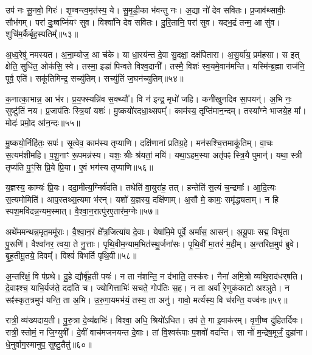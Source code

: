 उप॑ नः सू॒नवो॒ गिरः॑।
शृ॒ण्वन्त्व॒मृत॑स्य॒ ये।
सु॒मृ॒डी॒का भ॑वन्तु नः।
अ॒द्या नो॑ देव सवितः।
प्र॒जाव॑थ्सावीः॒ सौभ॑गम्।
परा॑ दुः॒ष्वप्नि॑यꣳ सुव।
विश्वा॑नि देव सवितः।
दु॒रि॒तानि॒ परा॑ सुव।
यद्भ॒द्रं तन्म॒ आ सु॑व।
शुचि॑म॒र्कैर्बृह॒स्पतिम्᳚॥५३॥

अ॒ध्व॒रेषु॑ नमस्यत।
अ॒ना॒म्योज॒ आ च॑के।
या धा॒रय॑न्त दे॒वा सु॒दक्षा॒ दक्ष॑पितारा।
अ॒सु॒र्या॑य॒ प्रम॑हसा।
स इत् क्षेति॒ सुधि॑त॒ ओक॑सि॒ स्वे।
तस्मा॒ इडा॑ पिन्वते विश्व॒दानी᳚।
तस्मै॒ विशः॑ स्व॒यमे॒वान॑मन्ति।
यस्मि॑न्ब्र॒ह्मा राज॑नि॒ पूर्व॒ एति॑।
सकू॑तिमिन्द्र॒ सच्यु॑तिम्।
सच्यु॑तिं ज॒घन॑च्युतिम्॥५४॥

क॒नात्का॒भान्न॒ आ भ॑र।
प्र॒य॒फ्स्यन्नि॑व स॒क्थ्यौ᳚।
वि न॑ इन्द्र॒ मृधो॑ जहि।
कनी॑खुनदिव सा॒पयन्॑।
अ॒भि नः॒ सुष्टु॑तिं नय।
प्र॒जा\-प॑तिः स्त्रि॒यां यशः॑।
मु॒ष्कयो॑रदधा॒थ्सपम्᳚।
काम॑स्य॒ तृप्ति॑मान॒न्दम्।
तस्या᳚ग्ने भाजये॒ह मा᳚।
मोदः॑ प्रमो॒द आ॑न॒न्दः॥५५॥

मु॒ष्कयो॒र्निहि॑तः॒ सपः॑।
सृ॒त्वेव॒ काम॑स्य तृप्याणि।
दक्षि॑णानां प्रतिग्र॒हे।
मन॑सश्चि॒त्तमाकू॑तिम्।
वा॒चः स॒त्यम॑शीमहि।
प॒शू॒नाꣳ रू॒पमन्न॑स्य।
यशः॒ श्रीः श्र॑यतां॒ मयि॑।
यथा॒ऽहम॒स्या अतृ॑पꣴ स्त्रि॒यै पुमान्॑।
यथा॒ स्त्री तृप्य॑ति पु॒ꣳ॒सि प्रि॒ये प्रि॒या।
ए॒वं भग॑स्य तृप्याणि॥५६॥

य॒ज्ञस्य॒ काम्यः॑ प्रि॒यः।
ददा॒मीत्य॒ग्निर्व॑दति।
तथेति॑ वा॒युरा॑ह॒ तत्।
हन्तेति॑ स॒त्यं च॒न्द्रमाः᳚।
आ॒दि॒त्यः स॒त्यमोमिति॑।
आप॒स्तथ्स॒त्यमा भ॑रन्।
यशो॑ य॒ज्ञस्य॒ दक्षि॑णाम्।
अ॒सौ मे॒ कामः॒ समृ॑द्ध्यताम्।
न हि स्पश॒मवि॑दन्न॒न्यम॒स्मात्।
वै॒श्वा॒न॒रात्पु॑रए॒तार॑म॒ग्नेः॥५७॥

अथे॑ममन्थन्न॒मृत॒ममू॑राः।
वै॒श्वा॒न॒रं क्षे᳚त्र॒जित्या॑य दे॒वाः।
येषा॑मि॒मे पूर्वे॒ अर्मा॑स॒ आसन्॑।
अ॒यू॒पाः सद्म॒ विभृ॑ता पु॒रूणि॑।
वैश्वा॑नर॒ त्वया॒ ते नु॒त्ताः।
पृ॒थि॒वीम॒न्याम॒भित॑स्थु॒र्जना॑सः।
पृ॒थि॒वीं मा॒तरं॑ म॒हीम्।
अ॒न्तरि॑क्ष॒मुप॑ ब्रुवे।
बृ॒ह॒तीमू॒तये॒ दिवम्᳚।
विश्वं॑ बिभर्ति पृथि॒वी॥५८॥

अ॒न्तरि॑क्षं॒ वि प॑प्रथे।
दु॒हे द्यौर्बृ॑ह॒ती पयः॑।
न ता न॑शन्ति॒ न द॑भाति॒ तस्क॑रः।
नैना॑ अमि॒त्रो व्यथि॒राद॑धर्‌\mbox{}षति।
दे॒वाꣴश्च॒ याभि॒र्यज॑ते॒ ददा॑ति च।
ज्योगित्ताभिः॑ सचते॒ गोप॑तिः स॒ह।
न ता अर्वा॑ रे॒णुक॑काटो अश्ञुते।
न सꣴ॑स्कृत॒त्रमुप॑ यन्ति॒ ता अ॒भि।
उ॒रु॒गा॒यमभ॑यं॒ तस्य॒ ता अनु॑।
गावो॒ मर्त्य॑स्य॒ वि च॑रन्ति॒ यज्व॑नः॥५९॥

रात्री॒ व्य॑ख्यदाय॒ती।
पु॒रु॒त्रा दे॒व्य॑क्षभिः॑।
विश्वा॒ अधि॒ श्रियो॑ऽधित।
उप॑ ते॒ गा इ॒वाक॑रम्।
वृ॒णी॒ष्व दु॑हितर्दिवः।
रात्री॒ स्तोमं॒ न जि॒ग्युषी᳚।
दे॒वीं वाच॑मजनयन्त दे॒वाः।
तां वि॒श्वरू॑पाः प॒शवो॑ वदन्ति।
सा नो॑ म॒न्द्रेष॒मूर्जं॒ दुहा॑ना।
धे॒नुर्वाग॒स्मानुप॒ सुष्टु॒तैतु॑॥६०॥

